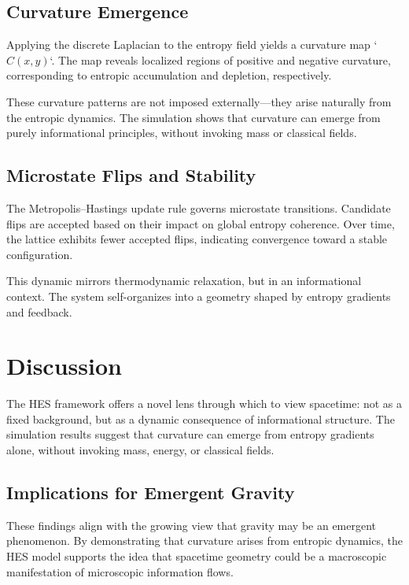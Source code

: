 \documentclass[12pt]{article}
\begin{document}
\subsection{Curvature Emergence}

Applying the discrete Laplacian to the entropy field yields a curvature map `\( C(x, y) \)`. The map reveals localized regions of positive and negative curvature, corresponding to entropic accumulation and depletion, respectively.

These curvature patterns are not imposed externally—they arise naturally from the entropic dynamics. The simulation shows that curvature can emerge from purely informational principles, without invoking mass or classical fields.

\subsection{Microstate Flips and Stability}

The Metropolis–Hastings update rule governs microstate transitions. Candidate flips are accepted based on their impact on global entropy coherence. Over time, the lattice exhibits fewer accepted flips, indicating convergence toward a stable configuration.

This dynamic mirrors thermodynamic relaxation, but in an informational context. The system self-organizes into a geometry shaped by entropy gradients and feedback.

\section{Discussion}

The HES framework offers a novel lens through which to view spacetime: not as a fixed background, but as a dynamic consequence of informational structure. The simulation results suggest that curvature can emerge from entropy gradients alone, without invoking mass, energy, or classical fields.

\subsection{Implications for Emergent Gravity}

These findings align with the growing view that gravity may be an emergent phenomenon. By demonstrating that curvature arises from entropic dynamics, the HES model supports the idea that spacetime geometry could be a macroscopic manifestation of microscopic information flows.
\end{document}
